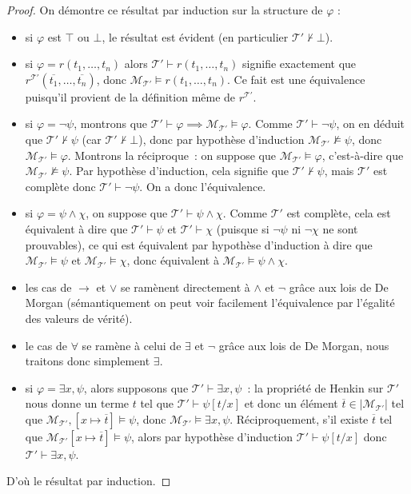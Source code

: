 \begin{proof}
  On démontre ce résultat par induction sur la structure de $\varphi$ :
  \begin{itemize}
  \item si $\varphi$ est $\top$ ou $\bot$, le résultat est évident (en
    particulier $\mathcal T'\not\vdash\bot$).
  \item si $\varphi = r(t_1,\ldots,t_n)$ alors
    $\mathcal T'\vdash r(t_1,\ldots,t_n)$ signifie exactement que
    $r^{\mathcal T'}(\overline{t_1},\ldots,\overline{t_n})$, donc
    $\mathcal M_{\mathcal T'}\models r(t_1,\ldots,t_n)$. Ce fait est une
    équivalence puisqu'il provient de la définition même de $r^{\mathcal T'}$.
  \item si $\varphi = \lnot \psi$, montrons que
    $\mathcal T'\vdash\varphi\implies \mathcal M_{\mathcal T'}\models \varphi$.
    Comme $\mathcal T'\vdash \lnot \psi$, on en déduit que
    $\mathcal T'\nvdash \psi$ (car $\mathcal T'\nvdash\bot$), donc par
    hypothèse d'induction $\mathcal M_{\mathcal T'}\not\models \psi$, donc
    $\mathcal M_{\mathcal T'}\models \varphi$. Montrons la réciproque~: on
    suppose que $\mathcal M_{\mathcal T'}\models \varphi$, c'est-à-dire que
    $\mathcal M_{\mathcal T'}\not\models \psi$. Par hypothèse d'induction, cela
    signifie que $\mathcal T'\nvdash \psi$, mais $\mathcal T'$ est complète
    donc $\mathcal T'\vdash\lnot\psi$. On a donc l'équivalence.
  \item si $\varphi = \psi \land \chi$, on suppose que
    $\mathcal T'\vdash \psi\land\chi$. Comme $\mathcal T'$ est complète, cela
    est équivalent à dire que $\mathcal T'\vdash \psi$ et
    $\mathcal T'\vdash \chi$ (puisque si $\lnot\psi$ ni $\lnot \chi$ ne sont
    prouvables), ce qui est équivalent par hypothèse d'induction à dire que
    $\mathcal M_{\mathcal T'}\models\psi$ et
    $\mathcal M_{\mathcal T'}\models\chi$, donc équivalent à
    $\mathcal M_{\mathcal T'}\models \psi\land \chi$.
  \item les cas de $\to$ et $\lor$ se ramènent directement à $\land$ et $\lnot$
    grâce aux lois de De Morgan (sémantiquement on peut voir facilement
    l'équivalence par l'égalité des valeurs de vérité).
  \item le cas de $\forall$ se ramène à celui de $\exists$ et $\lnot$ grâce
    aux lois de De Morgan, nous traitons donc simplement $\exists$.
  \item si $\varphi = \exists x, \psi$, alors supposons que
    $\mathcal T'\vdash \exists x, \psi$~: la propriété de Henkin sur
    $\mathcal T'$ nous donne un terme $t$ tel que $\mathcal T'\vdash \psi[t/x]$
    et donc un élément $\overline t \in |\mathcal M_{\mathcal T'}|$ tel que
    $\mathcal M_{\mathcal T'}, [x\mapsto \overline t] \models \psi$, donc
    $\mathcal M_{\mathcal T'}\models \exists x, \psi$. Réciproquement, s'il
    existe $\overline t$ tel que
    $\mathcal M_{\mathcal T'}[x\mapsto \overline t]\models \psi$, alors
    par hypothèse d'induction $\mathcal T'\vdash \psi[t/x]$ donc
    $\mathcal T'\vdash \exists x, \psi$.
  \end{itemize}

  D'où le résultat par induction.
\end{proof}

